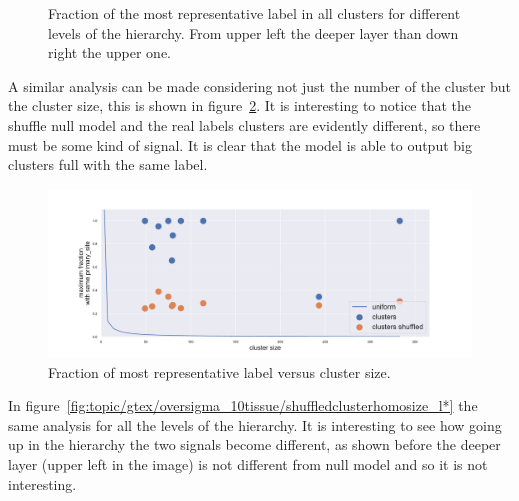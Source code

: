 \begin{figure}[htb!]
\begin{minipage}{0.45\textwidth}
    \end{minipage}
    \caption{Fraction of the most representative label in all clusters for different levels of the hierarchy. From upper left the deeper layer than down right the upper one.}
    \label{fig:topic/gtex/oversigma_10tissue/shuffledcluster_maximum*}
\end{figure}

A similar analysis can be made considering not just the number of the cluster but the cluster size, this is shown in figure~\ref{fig:topic/gtex/oversigma_10tissue/shuffledclusterhomosize_l3_primary_site}. It is interesting to notice that the shuffle null model and the real labels clusters are evidently different, so there must be some kind of signal. It is clear that the model is able to output big clusters full with the same label.
\begin{figure}[htb!]
	\centering
	\includegraphics[width=0.9\linewidth]{pictures/topic/gtex/oversigma_10tissue/shuffledclusterhomosize_l3_primary_site.pdf}
	\caption{Fraction of most representative label versus cluster size.}
	\label{fig:topic/gtex/oversigma_10tissue/shuffledclusterhomosize_l3_primary_site}
\end{figure}
In figure~\ref{fig:topic/gtex/oversigma_10tissue/shuffledclusterhomosize_l*} the same analysis for  all the levels of the hierarchy. It is interesting to see how going up in the hierarchy the two signals become different, as shown before the deeper layer (upper left in the image) is not different from null model and so it is not interesting.
